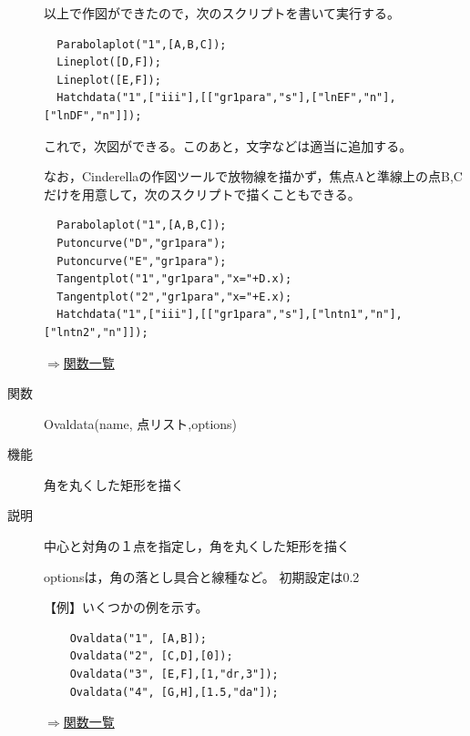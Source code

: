 \documentclass[papersize,a4paper,12pt,uplatex]{jsarticle}
\begin{document}
\begin{description}
\vspace{\baselineskip}
  以上で作図ができたので，次のスクリプトを書いて実行する。
\begin{verbatim}
  Parabolaplot("1",[A,B,C]);
  Lineplot([D,F]);
  Lineplot([E,F]);
  Hatchdata("1",["iii"],[["gr1para","s"],["lnEF","n"],["lnDF","n"]]);
\end{verbatim}

これで，次図ができる。このあと，文字などは適当に追加する。
 
\vspace{\baselineskip}
\begin{center} \end{center}

なお，Cinderellaの作図ツールで放物線を描かず，焦点Aと準線上の点B,Cだけを用意して，次のスクリプトで描くこともできる。
\begin{verbatim}
  Parabolaplot("1",[A,B,C]);
  Putoncurve("D","gr1para");
  Putoncurve("E","gr1para");
  Tangentplot("1","gr1para","x="+D.x);
  Tangentplot("2","gr1para","x="+E.x);
  Hatchdata("1",["iii"],[["gr1para","s"],["lntn1","n"],["lntn2","n"]]);
\end{verbatim}

\begin{flushright}  \hyperlink{functionlist}{$\Rightarrow$関数一覧}\end{flushright}

\hypertarget{ovaldata}{}
\item[関数]  Ovaldata(name, 点リスト,options)
\item[機能]  角を丸くした矩形を描く
\item[説明]  中心と対角の１点を指定し，角を丸くした矩形を描く

optionsは，角の落とし具合と線種など。 初期設定は0.2 

\vspace{\baselineskip}
【例】いくつかの例を示す。
\begin{verbatim}
    Ovaldata("1", [A,B]);
    Ovaldata("2", [C,D],[0]);
    Ovaldata("3", [E,F],[1,"dr,3"]);
    Ovaldata("4", [G,H],[1.5,"da"]);
\end{verbatim}
\begin{center} \end{center}

\begin{flushright}  \hyperlink{functionlist}{$\Rightarrow$関数一覧}\end{flushright}
\end{description}
\end{document}
